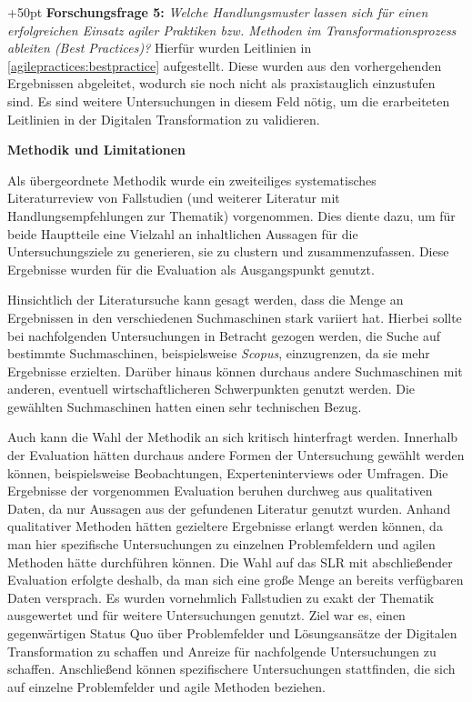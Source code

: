 \hangindent+50pt 
\textbf{Forschungsfrage 5:} \textit{Welche Handlungsmuster lassen sich für einen erfolgreichen Einsatz agiler Praktiken bzw. Methoden im Transformationsprozess ableiten (Best Practices)?}  Hierfür wurden Leitlinien in \ref{agilepractices:bestpractice} aufgestellt. Diese wurden aus den vorhergehenden Ergebnissen abgeleitet, wodurch sie noch nicht als praxistauglich einzustufen sind. Es sind weitere Untersuchungen in diesem Feld nötig, um die erarbeiteten Leitlinien in der Digitalen Transformation zu validieren.

\clearpage

\textbf{Methodik und Limitationen} 

Als übergeordnete Methodik wurde ein zweiteiliges systematisches Literaturreview von Fallstudien (und weiterer Literatur mit Handlungsempfehlungen zur Thematik) vorgenommen. Dies diente dazu, um für beide Hauptteile eine Vielzahl an inhaltlichen Aussagen für die Untersuchungsziele zu generieren, sie zu clustern und zusammenzufassen. Diese Ergebnisse wurden für die Evaluation als Ausgangspunkt genutzt. 

Hinsichtlich der Literatursuche kann gesagt werden, dass die Menge an Ergebnissen in den verschiedenen Suchmaschinen stark variiert hat. Hierbei sollte bei nachfolgenden Untersuchungen in Betracht gezogen werden, die Suche auf bestimmte Suchmaschinen, beispielsweise \textit{Scopus}, einzugrenzen, da sie mehr Ergebnisse erzielten. Darüber hinaus können durchaus andere Suchmaschinen mit anderen, eventuell wirtschaftlicheren Schwerpunkten genutzt werden. Die gewählten Suchmaschinen hatten einen sehr technischen Bezug.

Auch kann die Wahl der Methodik an sich kritisch hinterfragt werden. Innerhalb der Evaluation hätten durchaus andere Formen der Untersuchung gewählt werden können, beispielsweise Beobachtungen, Experteninterviews oder Umfragen. Die Ergebnisse der vorgenommen Evaluation beruhen durchweg aus qualitativen Daten, da nur Aussagen aus der gefundenen Literatur genutzt wurden. Anhand qualitativer Methoden hätten gezieltere Ergebnisse erlangt werden können, da man hier spezifische Untersuchungen zu einzelnen Problemfeldern und agilen Methoden hätte durchführen können. Die Wahl auf das SLR mit abschließender Evaluation erfolgte deshalb, da man sich eine große Menge an bereits verfügbaren Daten versprach. Es wurden vornehmlich Fallstudien zu exakt der Thematik ausgewertet und für weitere Untersuchungen genutzt. Ziel war es, einen gegenwärtigen Status Quo über Problemfelder und Lösungsansätze der Digitalen Transformation zu schaffen und Anreize für nachfolgende Untersuchungen zu schaffen. Anschließend können spezifischere Untersuchungen stattfinden, die sich auf einzelne Problemfelder und agile Methoden beziehen. 


